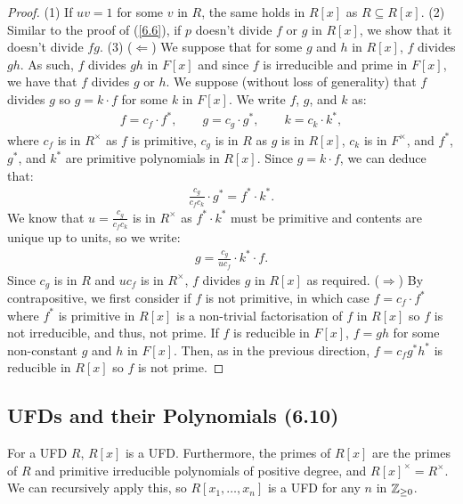 \begin{proof}
    (1) If $uv = 1$ for some $v$ in $R$, the same holds in $R[x]$ as $R \subseteq R[x]$.
    \bs
    (2) Similar to the proof of (\ref{6.6}), if $p$ doesn't divide $f$ or $g$ in $R[x]$,
    we show that it doesn't divide $fg$.
    \bs
    (3) ($\Longleftarrow$) We suppose that for some $g$ and $h$ in $R[x]$, $f$ divides $gh$.
    As such, $f$ divides $gh$ in $F[x]$ and since $f$ is irreducible and prime in $F[x]$,
    we have that $f$ divides $g$ or $h$. We suppose (without loss of generality) that $f$
    divides $g$ so $g = k \cdot f$ for some $k$ in $F[x]$. We write $f$, $g$, and $k$
    as: \begin{align*}
        f = c_f \cdot f^\ast, \qquad
        g = c_g \cdot g^\ast, \qquad
        k = c_k \cdot k^\ast,
    \end{align*} where $c_f$ is in $R^\times$ as $f$ is primitive, $c_g$ is in
    $R$ as $g$ is in $R[x]$, $c_k$ is in $F^\times$, and $f^\ast$, $g^\ast$, and 
    $k^\ast$ are primitive polynomials in $R[x]$. Since $g = k \cdot f$,
    we can deduce that: \begin{align*}
        \frac{c_g}{c_fc_k} \cdot g^\ast = f^\ast \cdot k^\ast.
    \end{align*} We know that $u = \frac{c_g}{c_fc_k}$ is in $R^\times$ as
    $f^\ast \cdot k^\ast$ must be primitive and contents are unique up to units, so we
    write: \begin{align*}
        g = \frac{c_g}{uc_f} \cdot k^\ast \cdot f.
    \end{align*} Since $c_g$ is in $R$ and $uc_f$ is in $R^\times$, $f$ divides $g$ in
    $R[x]$ as required.
    \bs
    ($\Longrightarrow$) By contrapositive, we first consider if $f$ is not primitive,
    in which case $f = c_f \cdot f^\ast$ where $f^\ast$ is primitive in $R[x]$ is a non-trivial
    factorisation of $f$ in $R[x]$ so $f$ is not irreducible, and thus, not prime.
    If $f$ is reducible in $F[x]$, $f = gh$ for some non-constant $g$ and $h$ in $F[x]$.
    Then, as in the previous direction, $f = c_f g^\ast h^\ast$ is reducible in $R[x]$
    so $f$ is not prime.
\end{proof}

\subsection{UFDs and their Polynomials (6.10)} \label{6.10}

For a UFD $R$, $R[x]$ is a UFD. Furthermore, the primes of $R[x]$
are the primes of $R$ and primitive irreducible polynomials of
positive degree, and $R[x]^\times = R^\times$. We can recursively apply this,
so $R[x_1, \ldots, x_n]$ is a UFD for any $n$ in $\mathbb{Z}_{\geq 0}$.

